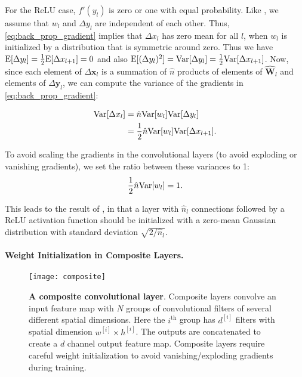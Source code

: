 \documentclass[thesis]{subfiles}
\begin{document}
    For the ReLU case, $f'(y_l)$ is zero or one with equal probability. 
    Like \citet{glorot2010understanding}, we assume that $w_l$ and $\Delta y_l$ are independent of each other. Thus, \cref{eq:back_prop_gradient} implies that $\Delta x_l$ has zero mean for all $l$, when $w_l$ is initialized by a distribution that is symmetric around zero. Thus we have $\mathrm{E}[\Delta y_l] = \frac{1}{2}\mathrm{E}[\Delta x_{l+1}]= 0$ and also $\mathrm{E}[(\Delta y_l)^2] = \mathrm{Var}[\Delta y_l] = \frac{1}{2} \mathrm{Var}[\Delta x_{l+1}]$. Now, since each element of $\Delta \mathbf{x}_l$ is a summation of $\hat n$ products of elements of $\hat{\mathbf{W}}_l$ and elements of $\Delta \mathbf{y}_l$, we can compute the variance of the gradients in \cref{eq:back_prop_gradient}:
    
    \begin{equation}
    \begin{aligned}
    \mathrm{Var}[\Delta x_l] &=  \hat{n} \mathrm{Var}[w_l] \mathrm{Var}[\Delta y_l]\\
    &= \frac{1}{2}   \hat{n} \mathrm{Var}[w_l] \mathrm{Var} [\Delta x_{l+1}].
    \end{aligned}
    \end{equation}
    
    
    To avoid scaling the gradients in the convolutional layers (to avoid exploding or vanishing gradients), we set the ratio between these variances to 1:
    \begin{equation}
    \frac{1}{2} \hat{n} \mathrm{Var}[w_l] = 1.
    \end{equation}
    
    This leads to the result of \citet{He2015b}, in that a layer with $\hat{n}_l$ connections followed by a ReLU activation function should be initialized with a zero-mean Gaussian distribution with standard deviation $\sqrt{2/ \hat{n}_l}$.
    
    \paragraph{Weight Initialization in Composite Layers.}
    \begin{figure}[tbp]
        \centering
        \texttt{[image: composite]}
        \caption[A composite convolutional layer.]{{\bf A composite convolutional layer}. Composite layers convolve an input feature map with $N$ groups of convolutional filters of several different spatial dimensions. Here the $i^\text{th}$ group has $d^{[i]}$ filters with spatial dimension $w^{[i]} \times h^{[i]}$. The outputs are concatenated to create a $d$ channel output feature map. Composite layers require careful weight initialization to avoid vanishing/exploding gradients during training.}
        \label{fig:compositelayers}
    \end{figure}
    
\end{document}
